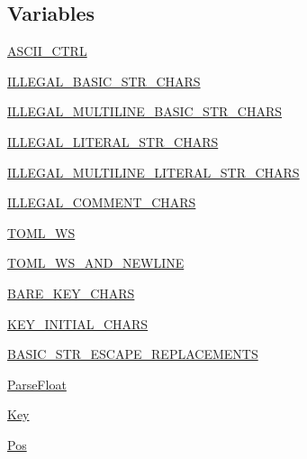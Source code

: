 \subsection*{Variables}
\begin{DoxyCompactItemize}
\item 
\hyperlink{namespacepip_1_1__vendor_1_1tomli_1_1__parser_a4a03c280fec37286a39dc8bc813f4dfc}{A\+S\+C\+I\+I\+\_\+\+C\+T\+RL}
\item 
\hyperlink{namespacepip_1_1__vendor_1_1tomli_1_1__parser_a9c5464402f41abc525843bced756cdcb}{I\+L\+L\+E\+G\+A\+L\+\_\+\+B\+A\+S\+I\+C\+\_\+\+S\+T\+R\+\_\+\+C\+H\+A\+RS}
\item 
\hyperlink{namespacepip_1_1__vendor_1_1tomli_1_1__parser_a85651e06dd43daff05446ffbdf004207}{I\+L\+L\+E\+G\+A\+L\+\_\+\+M\+U\+L\+T\+I\+L\+I\+N\+E\+\_\+\+B\+A\+S\+I\+C\+\_\+\+S\+T\+R\+\_\+\+C\+H\+A\+RS}
\item 
\hyperlink{namespacepip_1_1__vendor_1_1tomli_1_1__parser_a8e6ad75092b9652e1a9ddd256bbbf6a3}{I\+L\+L\+E\+G\+A\+L\+\_\+\+L\+I\+T\+E\+R\+A\+L\+\_\+\+S\+T\+R\+\_\+\+C\+H\+A\+RS}
\item 
\hyperlink{namespacepip_1_1__vendor_1_1tomli_1_1__parser_a003e06322728701a44ea464ef9c9f4eb}{I\+L\+L\+E\+G\+A\+L\+\_\+\+M\+U\+L\+T\+I\+L\+I\+N\+E\+\_\+\+L\+I\+T\+E\+R\+A\+L\+\_\+\+S\+T\+R\+\_\+\+C\+H\+A\+RS}
\item 
\hyperlink{namespacepip_1_1__vendor_1_1tomli_1_1__parser_a037c408406f54781979cc5cb5cf10208}{I\+L\+L\+E\+G\+A\+L\+\_\+\+C\+O\+M\+M\+E\+N\+T\+\_\+\+C\+H\+A\+RS}
\item 
\hyperlink{namespacepip_1_1__vendor_1_1tomli_1_1__parser_a08a25f3e9810f4a2860812bbd3ef7191}{T\+O\+M\+L\+\_\+\+WS}
\item 
\hyperlink{namespacepip_1_1__vendor_1_1tomli_1_1__parser_a312be93eb77789770ff65f68f06ee7a9}{T\+O\+M\+L\+\_\+\+W\+S\+\_\+\+A\+N\+D\+\_\+\+N\+E\+W\+L\+I\+NE}
\item 
\hyperlink{namespacepip_1_1__vendor_1_1tomli_1_1__parser_abefd58e7c95ffebe6e54c0b94529f2fb}{B\+A\+R\+E\+\_\+\+K\+E\+Y\+\_\+\+C\+H\+A\+RS}
\item 
\hyperlink{namespacepip_1_1__vendor_1_1tomli_1_1__parser_a60f19c7306b99d3a5fd74eb9fc483a14}{K\+E\+Y\+\_\+\+I\+N\+I\+T\+I\+A\+L\+\_\+\+C\+H\+A\+RS}
\item 
\hyperlink{namespacepip_1_1__vendor_1_1tomli_1_1__parser_a587ee0858661cce88e8bb49eeec547bb}{B\+A\+S\+I\+C\+\_\+\+S\+T\+R\+\_\+\+E\+S\+C\+A\+P\+E\+\_\+\+R\+E\+P\+L\+A\+C\+E\+M\+E\+N\+TS}
\item 
\hyperlink{namespacepip_1_1__vendor_1_1tomli_1_1__parser_af5eca7cc2eb4f3b2982c94cdeabca058}{Parse\+Float}
\item 
\hyperlink{namespacepip_1_1__vendor_1_1tomli_1_1__parser_a2cd957371ef09b0c8eb5dff024973969}{Key}
\item 
\hyperlink{namespacepip_1_1__vendor_1_1tomli_1_1__parser_a4a8f461dd88b9d27e3b562f289440723}{Pos}
\end{DoxyCompactItemize}



